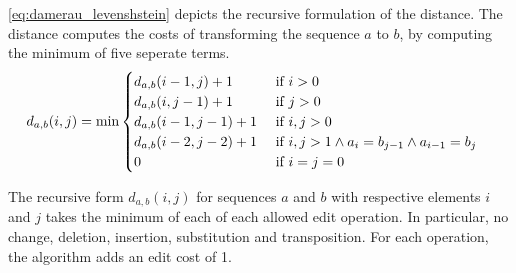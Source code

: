 \documentclass[./../../paper.tex]{subfiles}
\begin{document}
\noindent \autoref{eq:damerau_levenshstein} depicts the recursive formulation of the distance. The distance computes the costs of transforming the sequence $a$ to $b$, by computing the minimum of five seperate terms.  
\begin{align}
    \label{eq:damerau_levenshstein}
    d_{a, b}(i, j) & =\min
    \begin{cases}
        d_{a, b}(i-1, j  )+ 1 & \text { if } i>0                                            \\
        d_{a, b}(i  , j-1)+ 1 & \text { if } j>0                                            \\
        d_{a, b}(i-1, j-1)+ 1 & \text { if } i, j>0                                         \\
        d_{a, b}(i-2, j-2)+ 1 & \text { if } i, j>1 \land a_{i}=b_{j-1} \land a_{i-1}=b_{j} \\
        0                                 & \text { if } i=j=0                                         
    \end{cases}        
\end{align}

\noindent The recursive form $d_{a, b}(i, j)$ for sequences $a$ and $b$ with respective elements $i$ and $j$ takes the minimum of each of each allowed edit operation. In particular, no change, deletion, insertion, substitution and transposition. For each operation, the algorithm adds an edit cost of 1. 
\end{document}

